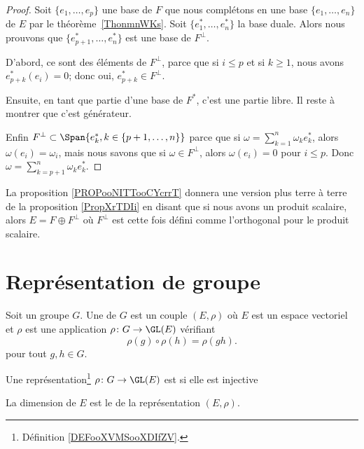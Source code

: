 \begin{proof}
	Soit \( \{ e_1,\ldots, e_p \}\) une base de \( F\) que nous complétons en une base \( \{ e_1,\ldots, e_n \}\) de \( E\) par le théorème~\ref{ThonmnWKs}. Soit \( \{ e_1^*,\ldots, e^*_n \}\) la base duale. Alors nous prouvons que \( \{ e^*_{p+1},\ldots, e_n^* \}\) est une base de \( F^{\perp}\).

	D'abord, ce sont des éléments de \( F^{\perp}\), parce que si \( i\leq p\) et si \( k\geq 1\), nous avons \( e^*_{p+k}(e_i)=0\); donc oui, \( e^*_{p+k}\in F^{\perp}\).

	Ensuite, en tant que partie d'une base de \( F^*\), c'est une partie libre. Il reste à montrer que c'est générateur.


	Enfin \( F^{\perp}\subset\Span\{ e_{k}^*, k \in \{p+1, \dots, n\}\}\) parce que si \( \omega=\sum_{k=1}^n\omega_ke_k^*\), alors \( \omega(e_i)=\omega_i\), mais nous savons que si \( \omega\in F^{\perp}\), alors \( \omega(e_i)=0\) pour \( i\leq p\). Donc \( \omega=\sum_{k=p+1}^n\omega_ke^*_k\).
\end{proof}


La proposition \ref{PROPooNITTooCYcrrT} donnera une version plus terre à terre de la proposition \ref{PropXrTDIi} en disant que si nous avons un produit scalaire, alors \( E=F\oplus F^{\perp}\) où \( F^{\perp}\) est cette fois défini comme l'orthogonal pour le produit scalaire.

\section{Représentation de groupe}

\begin{definition}[Représentation]      \label{DEFooXVMSooXDIfZV}
	Soit un groupe \( G\). Une  de \( G\) est un couple \( (E,\rho)\) où \( E\) est un espace vectoriel et \( \rho\) est une application \( \rho\colon G\to \GL(E)\) vérifiant
	\begin{equation}
		\rho(g)\circ\rho(h)=\rho(gh).
	\end{equation}
	pour tout \( g,h\in G\).
\end{definition}

\begin{definition}
	Une représentation\footnote{Définition \ref{DEFooXVMSooXDIfZV}.} \( \rho\colon G\to \GL(E)\) est  si elle est injective

	La dimension de \( E\) est le  de la représentation \( (E,\rho)\).
\end{definition}

